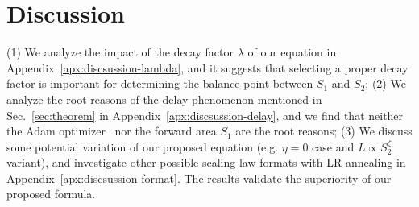 \vspace{-5pt}
\section{Discussion}
\vspace{-5pt}
\label{sec:short_discussion}
(1) We analyze the impact of the decay factor $\lambda$ of our equation in Appendix~\ref{apx:discsussion-lambda}, and it suggests that selecting a proper decay factor is important for determining the balance point between $S_1$ and $S_2$;
(2) We analyze the root reasons of the delay phenomenon mentioned in Sec.~\ref{sec:theorem} in Appendix~\ref{apx:discsussion-delay}, and we find that neither the Adam optimizer~\citep{adam-optim} nor the forward area $S_1$ are the root reasons;
(3) We discuss some potential variation of our proposed equation (e.g. $\eta=0$ case and $L\propto S_2^{\zeta}$ variant), and investigate other possible scaling law formats with LR annealing in Appendix~\ref{apx:discsussion-format}. The results validate the superiority of our proposed formula.